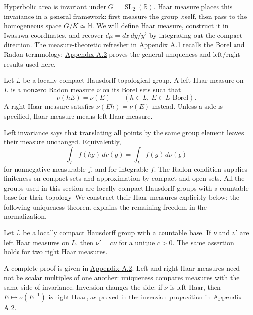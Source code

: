 Hyperbolic area is invariant under $G=\operatorname{SL}_2(\mathbb R)$. Haar measure places this invariance in a general framework: first measure the group itself, then pass to the homogeneous space $G/K\simeq\mathbb H$. We will define Haar measure, construct it in Iwasawa coordinates, and recover $d\mu=dx\,dy/y^2$ by integrating out the compact direction. The \hyperref[v1a-app-a-s1]{measure-theoretic refresher in Appendix A.1} recalls the Borel and Radon terminology; \hyperref[v1a-app-a-s2]{Appendix A.2} proves the general uniqueness and left/right results used here.

\begin{definition}\label{measure.haar}
Let $L$ be a locally compact Hausdorff topological group. A left Haar measure on $L$ is a nonzero Radon measure $\nu$ on its Borel sets such that
\[
 \nu(hE)=\nu(E)
 \qquad(h\in L,\ E\subset L\text{ Borel}).
\]
A right Haar measure satisfies $\nu(Eh)=\nu(E)$ instead. Unless a side is specified, Haar measure means left Haar measure.
\end{definition}

Left invariance says that translating all points by the same group element leaves their measure unchanged. Equivalently,
\[
 \int_L f(hg)\,d\nu(g)=\int_L f(g)\,d\nu(g)
\]
for nonnegative measurable $f$, and for integrable $f$. The Radon condition supplies finiteness on compact sets and approximation by compact and open sets. All the groups used in this section are locally compact Hausdorff groups with a countable base for their topology. We construct their Haar measures explicitly below; the following uniqueness theorem explains the remaining freedom in the normalization.

\begin{theorem}\label{measure.haar-uniqueness-summary}
Let $L$ be a locally compact Hausdorff group with a countable base. If $\nu$ and $\nu'$ are left Haar measures on $L$, then $\nu'=c\nu$ for a unique $c>0$. The same assertion holds for two right Haar measures.
\end{theorem}

A complete proof is given in \hyperref[measure.haar-uniqueness]{Appendix A.2}. Left and right Haar measures need not be scalar multiples of one another: uniqueness compares measures with the same side of invariance. Inversion changes the side: if $\nu$ is left Haar, then $E\mapsto\nu(E^{-1})$ is right Haar, as proved in the \hyperref[measure.haar-inversion]{inversion proposition in Appendix A.2}.

